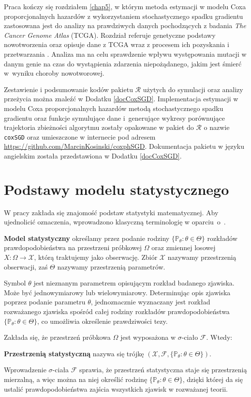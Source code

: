 Praca kończy się rozdziałem \ref{chap5}, w którym metoda estymacji w modelu Coxa proporcjonalnych hazardów z wykorzystaniem stochastycznego spadku gradientu zastosowana jest do analizy na prawdziwych danych pochodzących z badania \textit{The Cancer Genome Atlas} (TCGA). Rozdział referuje genetyczne podstawy nowotworzenia oraz opisuje dane z TCGA wraz z procesem ich pozyskania i przetwarzania \citep{kosa1, kosa2, kosa3}. Analiza ma na celu sprawdzenie wpływu występowania mutacji w danym genie na czas do wystąpienia zdarzenia niepożądanego, jakim jest śmierć w~wyniku choroby nowotworowej.

Zestawienie i podsumowanie kodów pakietu $\mathcal{R}$ użytych do symulacji oraz analizy przeżycia można znaleźć w Dodatku \ref{docCoxSGD}. Implementacja estymacji w modelu Coxa proporcjonalnych hazardów metodą stochastycznego spadku gradientu oraz funkcje symulujące dane i~generujące wykresy porównujące trajektoria zbieżności algorytmu zostały opakowane w pakiet do $\mathcal{R}$ o nazwie \texttt{coxSGD} \citep{kosa0} oraz umieszczone w internecie pod adresem \url{https://github.com/MarcinKosinski/coxphSGD}. Dokumentacja pakietu w języku angielskim została przedstawiona w Dodatku \ref{docCoxSGD}.

\chapter*{Podstawy modelu statystycznego}

W pracy zakłada się znajomość podstaw statystyki matematycznej. Aby ujednolicić oznaczenia, wprowadzono klasyczną terminologię w oparciu~o~\cite{niemiro}.

\begin{definition}
\textbf{Model statystyczny} określamy przez podanie rodziny $\{ \mathbb P_{\theta}:\theta\in\Theta\} $ rozkładów prawdopodobieństwa na przestrzeni próbkowej $\Omega$ oraz zmiennej losowej $X : \Omega \rightarrow \mathcal{X}$, którą traktujemy jako obserwację. Zbiór $\mathcal{X}$ nazywamy przestrzenią obserwacji, zaś $\Theta$ nazywamy przestrzenią parametrów. \\
\end{definition}
Symbol $\theta$ jest nieznanym parametrem opisującym rozkład badanego zjawiska. Może być jednowymiarowy lub wielowymiarowy. Determinując opis zjawiska poprzez podanie parametru $\theta$, jednoznacznie wyznaczany jest rozkład rozważanego zjawiska spośród całej rodziny rozkładów prawdopodobieństwa $\{ \mathbb P_{\theta}:\theta\in\Theta\}$, co umożliwia określenie prawdziwości tezy.
\par
Zakłada się, że przestrzeń próbkowa $\Omega$ jest wyposażona w $\sigma$-ciało $\mathcal{F}$. Wtedy:
\begin{definition}
\textbf{Przestrzenią statystyczną} nazywa się trójkę $(\mathcal{X},\mathcal{F},\{\mathbb P_{\theta}:\theta\in\Theta\})$.
\end{definition}
Wprowadzenie $\sigma$-ciała $\mathcal{F}$ sprawia, że przestrzeń statystyczna staje się przestrzenią mierzalną, a więc można na niej określić rodzinę $\{ \mathbb P_{\theta}:\theta\in\Theta\} $, dzięki której da się ustalić prawdopodobieństwa zajścia wszystkich zjawisk w rozważanej teorii.

